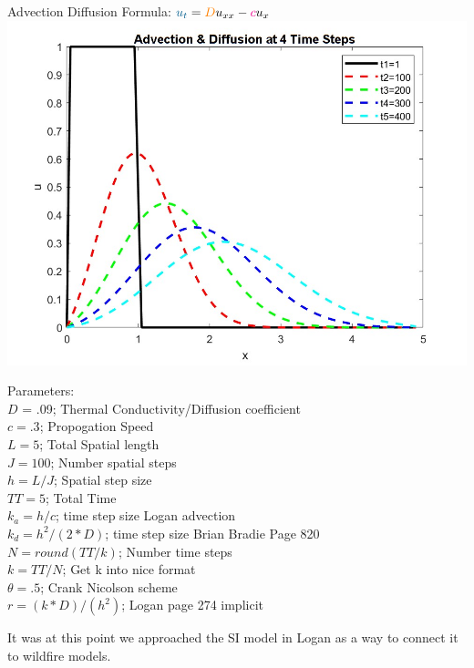 \documentclass{article}
\begin{document}
\begin{center}
    \begin{minipage}[t]{.49\textwidth}
    \centering
    {\Large Advection Diffusion Formula: $\textcolor{MidnightBlue}{u_t} = \textcolor{orange}{D}u_{xx}-\textcolor{magenta}{c}u_{x}$}
    \includegraphics[scale=0.20]{Hat_Advection_Diffusion_4_timestamp.jpg}
    \label{fig:Advection-Diffusion}
    \end{minipage}
    \hfill
    \begin{minipage}[t]{.49\textwidth}
    Parameters:\\
    $D$ = .09; Thermal Conductivity/Diffusion coefficient\\
    $c = .3$;  Propogation Speed\\
    $L = 5$;    Total Spatial length\\
    $J = 100$;  Number spatial steps\\
    $h = L/J$;  Spatial step size\\    
    $TT = 5$;   Total Time\\
    $k_a = h/c$; time step size Logan advection \\
    $k_d = h^2 / (2*D)$; time step size Brian Bradie Page 820\\
    $N = round(TT/k)$;      Number time steps \\
    $k = TT/N$;             Get k into nice format\\
    $\theta = .5$;           Crank Nicolson scheme\\
    $r = (k*D)/(h^2)$;      Logan page 274 implicit\\
    \end{minipage}
    
\end{center}
It was at this point we approached the SI model in Logan as a way to connect it to wildfire models.
\clearpage
\end{document}
